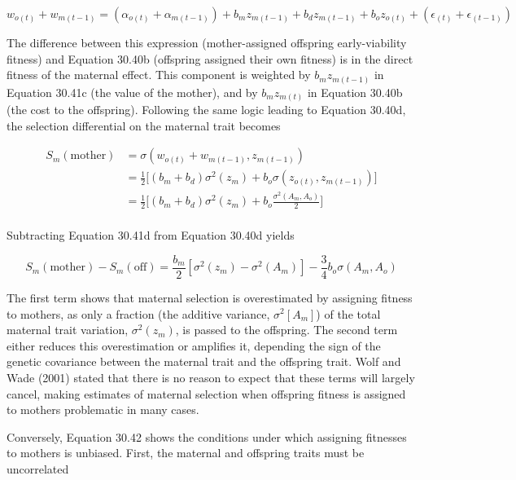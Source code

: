 \documentclass{article}
\begin{document}
\begin{equation}
w_{o(t)}+w_{m(t-1)}=\left(\alpha_{o(t)}+\alpha_{m(t-1)}\right)+b_{m}z_{m(t-1)}+b_{d}z_{m(t-1)}+b_{o}z_{o(t)}+\left(\epsilon_{(t)}+\epsilon_{(t-1)}\right)
\end{equation}

The difference between this expression (mother-assigned offspring early-viability fitness) and Equation 30.40b (offspring assigned their own fitness) is in the direct fitness of the maternal effect. This component is weighted by  $ b_{m}z_{m(t-1)} $ in Equation 30.41c (the value of the mother), and by  $ b_{m}z_{m(t)} $ in Equation 30.40b (the cost to the offspring). Following the same logic leading to Equation 30.40d, the selection differential on the maternal trait becomes

\begin{equation}
\begin{aligned}S_{m}(\mathrm{mother})&=\sigma(w_{o(t)}+w_{m(t-1)},z_{m(t-1)})\\&=\frac{1}{2}\Biggl[(b_{m}+b_{d})\sigma^{2}(z_{m})+b_{o}\sigma(z_{o(t)},z_{m(t-1)})\Biggr]\\&=\frac{1}{2}\Biggl[(b_{m}+b_{d})\sigma^{2}(z_{m})+b_{o}\frac{\sigma^{2}(A_{m},A_{o})}{2}\Biggr]\\ \end{aligned}
\tag{30.41d}
\label{eq:30_41d}
\end{equation}

Subtracting Equation 30.41d from Equation 30.40d yields

\begin{equation}
S_{m}(\mathrm{mother})-S_{m}(\mathrm{off})=\frac{b_{m}}{2}\left[\sigma^{2}(z_{m})-\sigma^{2}(A_{m})\right]-\frac{3}{4}b_{o}\sigma(A_{m},A_{o})
\tag{30.42}
\label{eq:30_42}
\end{equation}

The first term shows that maternal selection is overestimated by assigning fitness to mothers, as only a fraction (the additive variance,  $ \sigma^2[A_m] $) of the total maternal trait variation,  $ \sigma^2(z_m) $, is passed to the offspring. The second term either reduces this overestimation or amplifies it, depending the sign of the genetic covariance between the maternal trait and the offspring trait. Wolf and Wade (2001) stated that there is no reason to expect that these terms will largely cancel, making estimates of maternal selection when offspring fitness is assigned to mothers problematic in many cases.

Conversely, Equation 30.42 shows the conditions under which assigning fitnesses to mothers is unbiased. First, the maternal and offspring traits must be uncorrelated
\end{document}
